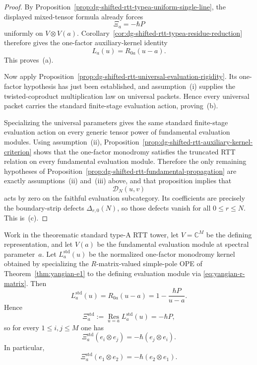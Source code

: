 \begin{proof}
By
Proposition~\ref{prop:dg-shifted-rtt-typea-uniform-single-line},
the displayed mixed-tensor formula already forces
\[
\Xi_a=-\hbar P
\]
uniformly on $V\otimes V(a)$.  Corollary~\ref{cor:dg-shifted-rtt-typea-residue-reduction}
therefore gives the one-factor auxiliary-kernel identity
\[
L_a(u)=R_{0a}(u-a).
\]
This proves~\textup{(a)}.

Now apply
Proposition~\ref{prop:dg-shifted-rtt-universal-evaluation-rigidity}.
Its one-factor hypothesis has just been established, and
assumption~\textup{(i)} supplies the twisted-coproduct multiplication
law on universal packets.  Hence every universal packet carries the
standard finite-stage evaluation action, proving~\textup{(b)}.

Specializing the universal parameters gives the same standard
finite-stage evaluation action on every generic tensor power of
fundamental evaluation modules.  Using assumption~\textup{(ii)},
Proposition~\ref{prop:dg-shifted-rtt-auxiliary-kernel-criterion}
shows that the one-factor monodromy satisfies the truncated RTT
relation on every fundamental evaluation module.  Therefore the only
remaining hypotheses of
Proposition~\ref{prop:dg-shifted-rtt-fundamental-propagation}
are exactly assumptions~\textup{(ii)} and~\textup{(iii)} above, and
that proposition implies that
\[
\mathcal{D}_N(u,v)
\]
acts by zero on the faithful evaluation subcategory.  Its coefficients
are precisely the boundary-strip defects
$\Delta_{r,0}(N)$, so those defects vanish for all $0\le r\le N$.
This is~\textup{(c)}.
\end{proof}

\begin{proposition}
\label{prop:dg-shifted-rtt-standard-typea-local-packet}
Work in the theorematic standard type-A RTT tower, let
$V=\mathbb{C}^M$ be the defining representation, and let $V(a)$ be the
fundamental evaluation module at spectral parameter~$a$.  Let
$L_a^{\mathrm{std}}(u)$ be the normalized one-factor monodromy kernel
obtained by specializing the $R$-matrix-valued simple-pole OPE of
Theorem~\ref{thm:yangian-e1} to the defining evaluation module via
\eqref{eq:yangian-r-matrix}.  Then
\[
L_a^{\mathrm{std}}(u)=R_{0a}(u-a)=1-\frac{\hbar P}{u-a}.
\]
Hence
\[
\Xi_a^{\mathrm{std}}
:=
\operatorname*{Res}_{u=a}L_a^{\mathrm{std}}(u)
=-\hbar P,
\]
so for every $1\le i,j\le M$ one has
\[
\Xi_a^{\mathrm{std}}(e_i\otimes e_j)=-\hbar(e_j\otimes e_i).
\]
In particular,
\[
\Xi_a^{\mathrm{std}}(e_1\otimes e_2)=-\hbar(e_2\otimes e_1).
\]
\end{proposition}

